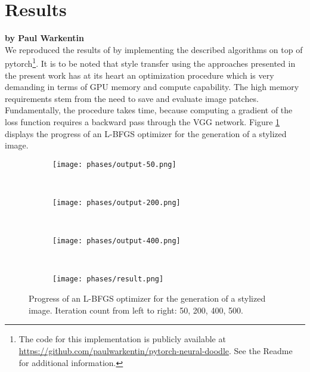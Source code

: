 
\clearpage
\section{Results}
\label{section:results}

\textbf{by Paul Warkentin} \\

We reproduced the results of \cite{doodles2016} by implementing the described algorithms on top of pytorch\footnote{The code for this implementation is publicly available at \url{https://github.com/paulwarkentin/pytorch-neural-doodle}. See the Readme for additional information.}. It is to be noted that style transfer using the approaches presented in the present work has at its heart an optimization procedure which is very demanding in terms of GPU memory and compute capability. The high memory requirements stem from the need to save and evaluate image patches. Fundamentally, the procedure takes time, because computing a gradient of the loss function requires a backward pass through the VGG network. Figure \ref{fig::phases} displays the progress of an L-BFGS optimizer for the generation of a stylized image.

\begin{figure}
	\begin{subfigure}[t]{0.23\textwidth}
		\centering
		\texttt{[image: phases/output-50.png]}
	\end{subfigure}%
	~
	\begin{subfigure}[t]{0.23\textwidth}
		\centering
		\texttt{[image: phases/output-200.png]}
	\end{subfigure}%
	~
	\begin{subfigure}[t]{0.23\textwidth}
		\centering
		\texttt{[image: phases/output-400.png]}
	\end{subfigure}
	~
	\begin{subfigure}[t]{0.23\textwidth}
		\centering
		\texttt{[image: phases/result.png]}
	\end{subfigure}
	
	\caption[]{Progress of an L-BFGS optimizer for the generation of a stylized image. Iteration count from left to right: 50, 200, 400, 500.}
	\label{fig::phases}
\end{figure}

